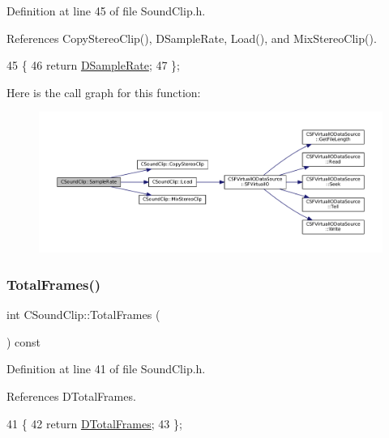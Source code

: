 Definition at line 45 of file Sound\+Clip.\+h.



References Copy\+Stereo\+Clip(), D\+Sample\+Rate, Load(), and Mix\+Stereo\+Clip().


\begin{DoxyCode}
45                               \{
46             \textcolor{keywordflow}{return} \hyperlink{classCSoundClip_ac1b9306140da2f89f6178833e0a9b887}{DSampleRate};  
47         \};
\end{DoxyCode}
Here is the call graph for this function\+:\nopagebreak
\begin{figure}[H]
\begin{center}
\leavevmode
\includegraphics[width=350pt]{classCSoundClip_ac89dc3d2f25a43fcd97268ec9828f709_cgraph}
\end{center}
\end{figure}
\hypertarget{classCSoundClip_abcd12e4989ecf6f31011e65c27c994f9}{}\label{classCSoundClip_abcd12e4989ecf6f31011e65c27c994f9} 
\subsubsection{\texorpdfstring{Total\+Frames()}{TotalFrames()}}
{\footnotesize\ttfamily int C\+Sound\+Clip\+::\+Total\+Frames (\begin{DoxyParamCaption}{ }\end{DoxyParamCaption}) const\hspace{0.3cm}{\ttfamily [inline]}}



Definition at line 41 of file Sound\+Clip.\+h.



References D\+Total\+Frames.


\begin{DoxyCode}
41                                \{
42             \textcolor{keywordflow}{return} \hyperlink{classCSoundClip_ab0d9eb261d09fa2a106658276f37285b}{DTotalFrames};  
43         \};
\end{DoxyCode}


